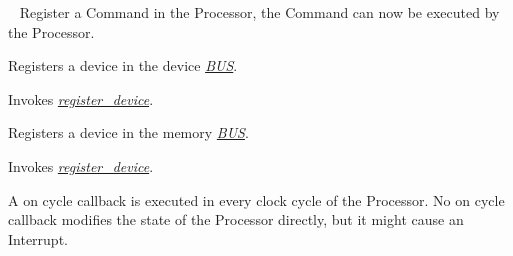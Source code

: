 \documentclass[letterpaper,10pt,english]{sphinxmanual}
\begin{document}
\begin{fulllineitems}
\begin{fulllineitems}
\end{fulllineitems}


\begin{fulllineitems}
\label{core:py_register_machine2.core.processor.Processor.register_command}~\label{core:register-command}
Register a Command in the Processor,
the Command can now be executed by the Processor.

\end{fulllineitems}


\begin{fulllineitems}
\label{core:py_register_machine2.core.processor.Processor.register_device}
Registers a device in the device {\hyperref[core:bus]{\emph{BUS}}}.

Invokes {\hyperref[core:register\string-device]{\emph{register\_device}}}.

\end{fulllineitems}


\begin{fulllineitems}
\label{core:py_register_machine2.core.processor.Processor.register_memory_device}
Registers a device in the memory {\hyperref[core:bus]{\emph{BUS}}}.

Invokes {\hyperref[core:register\string-device]{\emph{register\_device}}}.

\end{fulllineitems}


\begin{fulllineitems}
\label{core:py_register_machine2.core.processor.Processor.register_on_cycle_callback}
A on cycle callback is executed in every clock cycle of the
Processor. No on cycle callback modifies the state of the Processor directly,
but it might cause an Interrupt.


\end{fulllineitems}
\end{fulllineitems}
\end{document}
